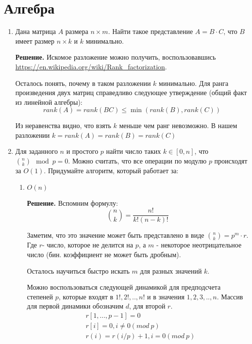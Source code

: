\section*{Алгебра}
\begin{enumerate}
	\item Дана матрица $A$ размера $n \times m$. Найти такое представление $A = B \cdot C$, что $B$ имеет размер $n 
	\times k$ и $k$ минимально.
	
	\textbf{Решение.} Искомое разложение можно получить, воспользовавшись
	 \url{https://en.wikipedia.org/wiki/Rank_factorization}.
	 
	 Осталось понять, почему в таком разложении $k$ минимально. Для ранга произведения двух матриц справедливо следующее утверждение (общий факт из линейной алгебры):
	 \begin{equation*}
	 	rank(A) = rank(BC) \leqslant \min(rank(B), rank(C))
	 \end{equation*}
	 
	 Из неравенства видно, что взять $k$ меньше чем ранг невозможно. В нашем разложении $k = rank(A) = rank(B) = 
	 rank(C)$
	
	\item Для заданного $n$ и простого $p$ найти число таких $k \in [0, n]$, что $\binom{n}{k} \mod p = 0$. Можно 
	считать, что все операции по модулю $p$ происходят за $O(1)$. Придумайте алгоритм, который работает за:
	\begin{enumerate}
		\item $O(n)$
		
		\textbf{Решение.} Вспомним формулу:
		\begin{equation*}
		\binom{n}{k} = \frac{n!}{k!(n - k)!}
		\end{equation*}
		
		Заметим, что это значение может быть представлено в виде $\binom{n}{k} = p^m \cdot r$. Где $r$- число, 
		которое не делится на $p$, а $m$ - некоторое неотрицательное число (бин. коэффициент не может быть 
		дробным).
		
		Осталось научиться быстро искать $m$ для разных значений $k$.
		
		Можно воспользоваться следующей динамикой для предподсчета степеней $p$, которые входят в $1!, 2!, .., 
		n!$ и в значения $1,2,3, .., n$. Массив для первой динамики обозначим $d$, для второй $r$.
		\begin{align*}
			&r[1, ..., p - 1] = 0 \\
			&r[i] = 0, i \neq 0 (mod \ p) \\
			&r(i) = r(i / p) + 1, i = 0(mod \ p)
		\end{align*}
		

\end{enumerate}
\end{enumerate}
